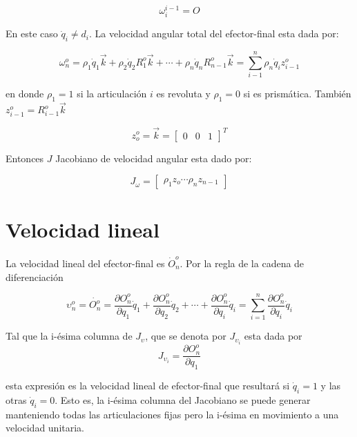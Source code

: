 \documentclass[10pt,a4paper]{article}
\begin{document}
$$ \omega_i^{i-1} = O $$

En este caso $\dot{q}_i \neq d_i$. La velocidad angular total del efector-final esta dada por:

$$ \omega_n^o = \rho_1 \dot{q}_1 \vec{k} + \rho_2 \dot{q}_2 R_1^o \vec{k} + \cdots + \rho_n \dot{q}_n R_{n-1}^o \vec{k} = \sum_{i-1}^{n} \rho_n \dot{q}_i z_{i-1}^o$$

en donde $\rho_1 = 1$ si la articulación $i$ es revoluta y $\rho_1 = 0$ si es prismática. También $z_{i-1}^o = R_{i-1}^o \vec{k}$

\begin{multicols}{2}

	$$ z_o^o = \vec{k} = \begin{bmatrix}
		0 & 0 & 1
	\end{bmatrix}^T $$

	Entonces $J$ Jacobiano de velocidad angular esta dado por:

	$$ J_\omega = \begin{bmatrix}
		\rho_1 z_o \cdots \rho_n z_{n-1}
	\end{bmatrix} $$

	\columnbreak
\end{multicols}

\section{Velocidad lineal}
La velocidad lineal del efector-final es $\dot{O}_n^o$. Por la regla de la cadena de diferenciación

$$ \upsilon_n^o = \dot{O_n^o} = \frac{\partial O_n^o}{\partial q_1} \dot{q}_1 +  \frac{\partial O_n^o}{\partial q_2} \dot{q}_2 + \cdots + \frac{\partial O_n^o}{\partial q_i} \dot{q}_i = \sum_{i=1}^{n} \frac{\partial O_n^o}{\partial q_i} \dot{q}_i $$

Tal que la i-ésima columna de $J_{\upsilon}$, que se denota por $J_{\upsilon_i}$ esta dada por
$$ J_{\upsilon_i} = \frac{\partial O_n^o}{\partial q_1} $$

esta expresión es la velocidad lineal de efector-final que resultará si $\dot{q}_i = 1$ y las otras $\dot{q}_i = 0$. Esto es, la i-ésima columna del Jacobiano se puede generar manteniendo todas las articulaciones fijas pero la i-ésima en movimiento a una velocidad unitaria.
\newpage
\end{document}
